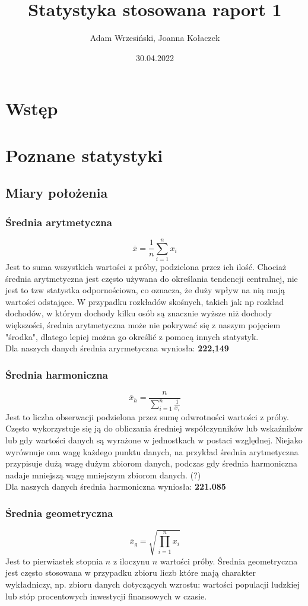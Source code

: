 \documentclass{article}
\title{Statystyka stosowana raport 1}
\author{Adam Wrzesiński, Joanna Kołaczek}
\date{30.04.2022}
\theoremstyle{break}
\begin{document}
	\maketitle
	\tableofcontents
	\clearpage
\section{Wstęp}

\section{Poznane statystyki}
\subsection{Miary położenia}
\subsubsection{Średnia arytmetyczna}
$$\overline{x}=\frac{1}{n}\sum\limits_{i=1}^{n}x_i$$
Jest to suma wszystkich wartości z próby, podzielona przez ich ilość. Chociaż średnia arytmetyczna jest często używana do określania tendencji centralnej, nie jest to tzw statystka odpornościowa, co oznacza, że duży wpływ na nią mają wartości odstające. W przypadku rozkładów skośnych, takich jak np rozkład dochodów, w którym dochody kilku osób są znacznie wyższe niż dochody większości, średnia arytmetyczna może nie pokrywać się z naszym pojęciem "środka", dlatego lepiej można go określić z pomocą innych statystyk.\\
Dla naszych danych średnia aryrmetyczna wyniosła: \textbf{222,149}
\subsubsection{Średnia harmoniczna}
$$\overline{x}_h=\frac{n}{\sum\limits_{i=1}^{n}\frac{1}{x_i}}$$
Jest to liczba obserwacji podzielona przez sumę odwrotności wartości z próby. Często wykorzystuje się ją do obliczania średniej współczynników lub wskaźników lub gdy wartości danych są wyrażone w jednostkach w postaci względnej. Niejako wyrównuje ona wagę każdego punktu danych, na przykład średnia arytmetyczna przypisuje dużą wagę dużym zbiorom danych, podczas gdy średnia harmoniczna nadaje mniejszą wagę mniejszym zbiorom danych. (?) \\
Dla naszych danych średnia harmoniczna wyniosła: \textbf{221.085}
\subsubsection{Średnia geometryczna}
$$\overline{x}_g=\sqrt{\prod\limits_{i=1}^{n}x_i}$$
Jest to pierwiastek stopnia $n$ z iloczynu $n$ wartości próby. Średnia geometryczna jest często stosowana w przypadku zbioru liczb które mają charakter wykładniczy, np. zbioru danych dotyczących wzrostu: wartości populacji ludzkiej lub stóp procentowych inwestycji finansowych w czasie.
\end{document}
